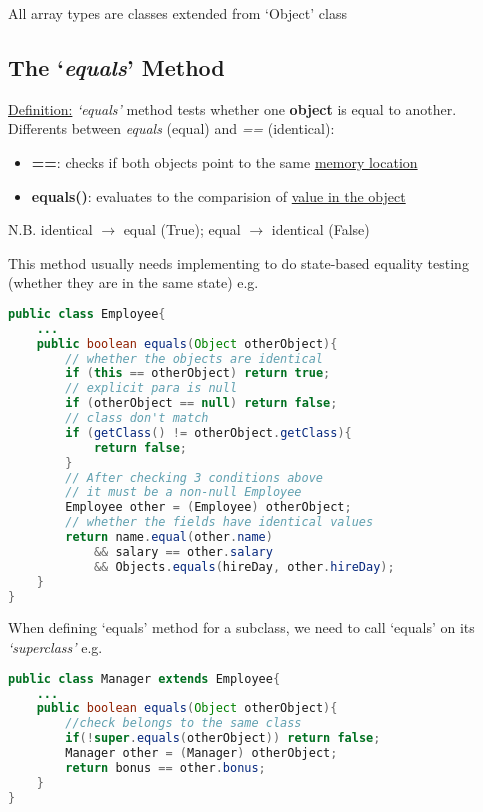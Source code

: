 \documentclass[12pt]{article}
\begin{document}
All array types are classes extended from `Object' class

\subsection{The `\emph{equals}' Method}
\underline{Definition:} \emph{`equals'} method tests whether one \textbf{object} is equal to another.\newline
Differents between \emph{equals} (equal) and \emph{==} (identical):
\begin{itemize}
    \item \textbf{==}: checks if both objects point to the same \underline{memory location}
    \item \textbf{equals()}: evaluates to the comparision of \underline{value in the object}
\end{itemize}
N.B. identical $\rightarrow$ equal (True); equal $\rightarrow$ identical (False)

This method usually needs implementing to do state-based equality testing (whether they are in the same state)\newline
e.g.
\begin{lstlisting}[language=Java]
public class Employee{
    ... 
    public boolean equals(Object otherObject){
        // whether the objects are identical
        if (this == otherObject) return true;
        // explicit para is null
        if (otherObject == null) return false;
        // class don't match
        if (getClass() != otherObject.getClass){
            return false;
        }
        // After checking 3 conditions above
        // it must be a non-null Employee
        Employee other = (Employee) otherObject;
        // whether the fields have identical values
        return name.equal(other.name)
            && salary == other.salary
            && Objects.equals(hireDay, other.hireDay);
    }
}
\end{lstlisting}

When defining `equals' method for a subclass, we need to call `equals' on its \emph{`superclass'}\newline
e.g.
\begin{lstlisting}[language=Java]
public class Manager extends Employee{
    ... 
    public boolean equals(Object otherObject){
        //check belongs to the same class
        if(!super.equals(otherObject)) return false;
        Manager other = (Manager) otherObject;
        return bonus == other.bonus;
    }
}
\end{lstlisting}
\end{document}
